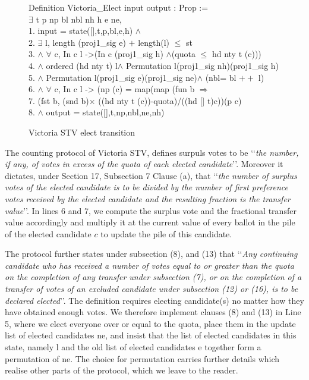 \documentclass{llncs}
\begin{document}
\begin{scriptsize}
\begin{figure}[b]
{\selectfont
 Definition Victoria\_Elect \textsf{input} \textsf{output} : Prop :=\\ $\exists$ t p np bl nbl nh h e ne, \\
     1. \textsf{input} = \textsf{state}([],t,p,bl,e,h) $\wedge$\\
     2. $\exists$ l, \textsf{length} (proj1\_sig e) $+$ \textsf{length}(l)  $\leq$ st \\
  3. $\wedge$ $\forall$ c, In c l ->(In c (proj1\_sig h) $\wedge$(quota $\leq$ \textsf{hd} nty t (c)))\\
 4.   $\wedge$ \textsf{ordered} (\textsf{hd} nty t) l$\wedge$ \textsf{Permutation} l(proj1\_sig nh)(proj1\_sig h) \\
 5. $\wedge$ \textsf{Permutation} l(proj1\_sig e)(proj1\_sig ne)$\wedge$ (nbl= bl $++$ l)\\
 6. $\wedge$ $\forall$ c, In c l -> (np (c) = \textsf{map}(\textsf{map} (\textsf{fun} b $\Rightarrow$\\ 
 7. (\textsf{fst} b, (\textsf{snd} b)$\times$ ((\textsf{hd} nty t (c))-quota)/((\textsf{hd} [] t)c))(p c)\\
 8. $\wedge$ \textsf{output} = \textsf{state}([],t,np,nbl,ne,nh)
}
\caption{Victoria STV elect transition}
\label{fig;fig.3}
\end{figure}
\end{scriptsize}

The counting protocol of Victoria STV, defines surpuls votes to be \lq\lq \emph{the number, if any, of votes in excess of the
quota of each elected candidate}\rq\rq. Moreover it dictates, under Section 17, Subsection 7 Clause (a), that \lq\lq  \emph{the number of surplus votes of the elected candidate is to be
divided by the number of first preference votes received by the
elected candidate and the resulting fraction is the transfer value}\rq\rq. In lines 6 and 7, we compute the surplus vote and the fractional transfer value accordingly and multiply it at the current value of every ballot in the pile of the elected candidate $c$ to update the pile of this candidate. 


The protocol further states under subsection (8), and (13) that \lq\lq \emph{Any continuing candidate who has received a number of votes equal to
or greater than the quota on the completion of any transfer under subsection (7), or on the completion of a transfer of votes of an
excluded candidate under subsection (12) or (16), is to be declared elected}\rq\rq. 
The definition requires electing candidate(s) no matter how they
have obtained enough votes. We therefore implement clauses (8) and
(13) in Line 5, where we elect everyone over or equal to the quota,
place them in the update list of elected candidates
{\selectfont ne}, and insist that the list of
elected candidates in this state, namely
{\selectfont l} and the old list of elected
candidates {\selectfont e} together form a
permutation of {\selectfont ne}. The choice for
permutation carries further details which realise other parts of the
protocol, which we leave to the reader. 
\end{document}
